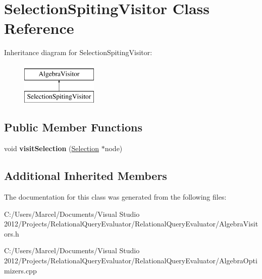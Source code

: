 \hypertarget{class_selection_spiting_visitor}{\section{Selection\+Spiting\+Visitor Class Reference}
\label{class_selection_spiting_visitor}
}
Inheritance diagram for Selection\+Spiting\+Visitor\+:\begin{figure}[H]
\begin{center}
\leavevmode
\includegraphics[height=2.000000cm]{class_selection_spiting_visitor}
\end{center}
\end{figure}
\subsection*{Public Member Functions}
\begin{DoxyCompactItemize}
\item 
\hypertarget{class_selection_spiting_visitor_ac494bc17989d4fe23736f6ce55972aba}{void {\bfseries visit\+Selection} (\hyperlink{class_selection}{Selection} $\ast$node)}\label{class_selection_spiting_visitor_ac494bc17989d4fe23736f6ce55972aba}

\end{DoxyCompactItemize}
\subsection*{Additional Inherited Members}


The documentation for this class was generated from the following files\+:\begin{DoxyCompactItemize}
\item 
C\+:/\+Users/\+Marcel/\+Documents/\+Visual Studio 2012/\+Projects/\+Relational\+Query\+Evaluator/\+Relational\+Query\+Evaluator/Algebra\+Visitors.\+h\item 
C\+:/\+Users/\+Marcel/\+Documents/\+Visual Studio 2012/\+Projects/\+Relational\+Query\+Evaluator/\+Relational\+Query\+Evaluator/Algebra\+Optimizers.\+cpp\end{DoxyCompactItemize}
